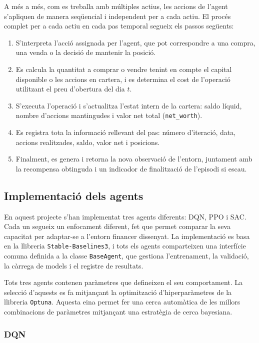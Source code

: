 \documentclass[12pt,a4paper,twoside]{book}
\begin{document}
A més a més, com es treballa amb múltiples actius, les accions de l'agent s'apliquen de manera seqüencial i independent per a cada actiu. El procés complet per a cada actiu en cada pas temporal segueix els passos següents:

\begin{enumerate}
    \item S'interpreta l'acció assignada per l'agent, que pot correspondre a una compra, una venda o la decisió de mantenir la posició.
    \item Es calcula la quantitat a comprar o vendre tenint en compte el capital disponible o les accions en cartera, i es determina el cost de l'operació utilitzant el preu d'obertura del dia $t$.
    \item S'executa l'operació i s'actualitza l'estat intern de la cartera: saldo líquid, nombre d'accions mantingudes i valor net total (\texttt{net\_worth}).
    \item Es registra tota la informació rellevant del pas: número d'iteració, data, accions realitzades, saldo, valor net i posicions.
    \item Finalment, es genera i retorna la nova observació de l'entorn, juntament amb la recompensa obtinguda i un indicador de finalització de l'episodi si escau.
\end{enumerate}


\subsection{Implementació dels agents}

En aquest projecte s'han implementat tres agents diferents: DQN, PPO i SAC. Cada un segueix un enfocament diferent, fet que permet comparar la seva capacitat per adaptar-se a l'entorn financer dissenyat. La implementació es basa en la llibreria \texttt{Stable-Baselines3}, i tots els agents comparteixen una interfície comuna definida a la classe \texttt{BaseAgent}, que gestiona l'entrenament, la validació, la càrrega de models i el registre de resultats.

Tots tres agents contenen paràmetres que defineixen el seu comportament. La selecció d'aquests es fa mitjançant la optimització d'hiperparàmetres de la llibreria \texttt{Optuna}. Aquesta eina permet fer una cerca automàtica de les millors combinacions de paràmetres mitjançant una estratègia de cerca bayesiana.

\subsubsection{DQN}
\end{document}
